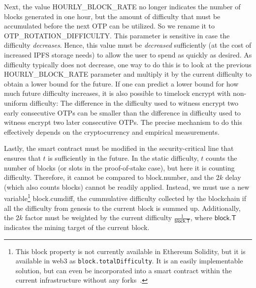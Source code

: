 Next, the value \textsf{HOURLY\_BLOCK\_RATE} no longer indicates the number of
blocks generated in one hour, but the amount of difficulty that must be accumulated
before the next OTP can be utilized. So we rename it to
\textsf{OTP\_ROTATION\_DIFFICULTY}. This parameter is sensitive in case the difficulty
\emph{decreases}. Hence, this value must be \emph{decreased} sufficiently
(at the cost of increased IPFS storage needs) to allow the user to spend
as quickly as desired. As difficulty typically does not decrease, one way
to do this is to look at the previous \textsf{HOURLY\_BLOCK\_RATE} parameter
and multiply it by the current difficulty to obtain a lower bound for the future.
If one can predict a lower bound for how much future difficulty increases, it
is also possible to timelock encrypt with non-uniform difficulty: The difference
in the difficulty used to witness encrypt two early consecutive OTPs can be
smaller than the difference in difficulty used to witness encrypt two later
consecutive OTPs. The precise mechanism to do this effectively depends on the
cryptocurrency and empirical measurements.

Lastly, the smart contract must be modified in the security-crit\-i\-cal line that
ensures that $t$ is sufficiently in the future. In the static difficulty, $t$
counts the number of blocks (or slots in the proof-of-stake case), but here
it is counting difficulty. Therefore, it cannot be compared to \textsf{block.number},
and the $2k$ delay (which also counts blocks) cannot be readily applied.
Instead, we must use a new variable\footnote{This block property is not currently available
in Ethereum Solidity, but it is available in web3 as \texttt{block.totalDifficulty}.
It is an easily implementable solution, but can even be incorporated into a smart
contract within the current infrastructure without any forks~\cite{derivatives}.}
\textsf{block.cumdiff},
the cummulative difficulty collected by the blockchain
if all the difficulty from genesis to the current block is summed up.
Additionally, the $2k$ factor must be weighted by the current difficulty
$\frac{1}{\textsf{block.T}}$, where $\textsf{block.T}$ indicates the
mining target of the current block.

